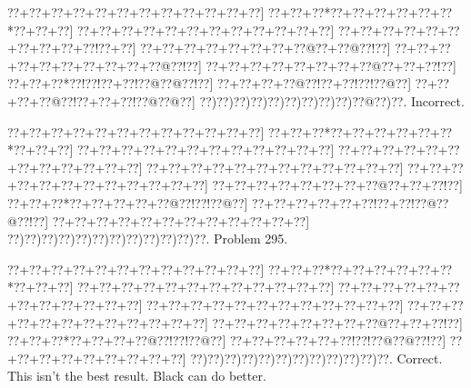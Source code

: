\documentclass[a5paper]{article}
\begin{document}
\begin{center}
{\goo
\0??+\0??+\0??+\0??+\0??+\0??+\0??+\0??+\0??+\0??+\0??+\0??]
\0??+\0??+\0??*\0??+\0??+\0??+\0??+\0??+\0??*\0??+\0??+\0??]
\0??+\0??+\0??+\0??+\0??+\0??+\0??+\0??+\0??+\0??+\0??+\0??]
\0??+\0??+\0??+\0??+\0??+\0??+\0??+\0??+\0??+\0??!\0??+\0??]
\0??+\0??+\0??+\0??+\0??+\0??+\0??+\0??@\0??+\0??@\0??!\0??]
\0??+\0??+\0??+\0??+\0??+\0??+\0??+\0??+\0??+\0??@\0??!\0??]
\0??+\0??+\0??+\0??+\0??+\0??+\0??+\0??@\0??+\0??+\0??!\0??]
\0??+\0??+\0??*\0??!\0??!\0??+\0??!\0??@\0??@\0??!\0??]
\0??+\0??+\0??+\0??@\0??!\0??+\0??!\0??!\0??@\0??]
\0??+\0??+\0??+\0??@\0??!\0??+\0??+\0??!\0??@\0??@\0??]
\0??)\0??)\0??)\0??)\0??)\0??)\0??)\0??)\0??)\0??@\0??)\0??.
}
Incorrect. 

\end{center}
\newpage
\begin{center}
{\goo
\0??+\0??+\0??+\0??+\0??+\0??+\0??+\0??+\0??+\0??+\0??+\0??]
\0??+\0??+\0??*\0??+\0??+\0??+\0??+\0??+\0??*\0??+\0??+\0??]
\0??+\0??+\0??+\0??+\0??+\0??+\0??+\0??+\0??+\0??+\0??+\0??]
\0??+\0??+\0??+\0??+\0??+\0??+\0??+\0??+\0??+\0??+\0??+\0??]
\0??+\0??+\0??+\0??+\0??+\0??+\0??+\0??+\0??+\0??+\0??+\0??]
\0??+\0??+\0??+\0??+\0??+\0??+\0??+\0??+\0??+\0??+\0??+\0??]
\0??+\0??+\0??+\0??+\0??+\0??+\0??+\0??@\0??+\0??+\0??!\0??]
\0??+\0??+\0??*\0??+\0??+\0??+\0??+\0??@\0??!\0??!\0??@\0??]
\0??+\0??+\0??+\0??+\0??+\0??!\0??+\0??!\0??@\0??@\0??!\0??]
\0??+\0??+\0??+\0??+\0??+\0??+\0??+\0??+\0??+\0??+\0??+\0??]
\0??)\0??)\0??)\0??)\0??)\0??)\0??)\0??)\0??)\0??)\0??)\0??.
}
Problem 295.

\end{center}
\begin{center}
{\goo
\0??+\0??+\0??+\0??+\0??+\0??+\0??+\0??+\0??+\0??+\0??+\0??]
\0??+\0??+\0??*\0??+\0??+\0??+\0??+\0??+\0??*\0??+\0??+\0??]
\0??+\0??+\0??+\0??+\0??+\0??+\0??+\0??+\0??+\0??+\0??+\0??]
\0??+\0??+\0??+\0??+\0??+\0??+\0??+\0??+\0??+\0??+\0??+\0??]
\0??+\0??+\0??+\0??+\0??+\0??+\0??+\0??+\0??+\0??+\0??+\0??]
\0??+\0??+\0??+\0??+\0??+\0??+\0??+\0??+\0??+\0??+\0??+\0??]
\0??+\0??+\0??+\0??+\0??+\0??+\0??+\0??@\0??+\0??+\0??!\0??]
\0??+\0??+\0??*\0??+\0??+\0??+\0??@\0??!\0??!\0??@\0??]
\0??+\0??+\0??+\0??+\0??+\0??!\0??!\0??@\0??@\0??!\0??]
\0??+\0??+\0??+\0??+\0??+\0??+\0??+\0??+\0??]
\0??)\0??)\0??)\0??)\0??)\0??)\0??)\0??)\0??)\0??)\0??)\0??.
}
Correct. This isn't the best result. Black can do better. 

\end{center}
\end{document}
